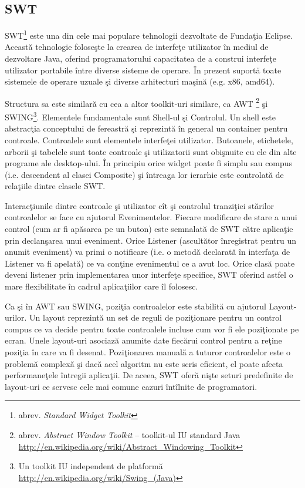 \subsection{SWT}
SWT\footnote{abrev. \textit{Standard Widget Toolkit}} este una din cele mai 
populare tehnologii dezvoltate de Fundaţia Eclipse. Această tehnologie 
foloseşte la crearea de interfeţe utilizator în mediul de dezvoltare Java, 
oferind programatorului capacitatea de a construi interfeţe utilizator 
portabile între diverse sisteme de operare. În prezent suportă toate sistemele 
de operare uzuale şi diverse arhitecturi maşină (e.g. x86, amd64).

Structura sa este similară cu cea a altor toolkit-uri similare, ca AWT 
\footnote{abrev. \textit{Abstract Window Toolkit} -- toolkit-ul IU standard 
Java \url{http://en.wikipedia.org/wiki/Abstract_Windowing_Toolkit}} şi 
SWING\footnote{Un toolkit IU independent de platformă 
\url{http://en.wikipedia.org/wiki/Swing_(Java)}}. Elementele fundamentale sunt 
Shell-ul şi Controlul. Un shell este abstracţia conceptului de fereastră şi 
reprezintă în general un container pentru controale. Controalele sunt 
elementele interfeţei utilizator. Butoanele, etichetele, arborii şi tabelele 
sunt toate controale şi utilizatorii sunt obişnuite cu ele din alte programe 
ale desktop-ului. \cite{swt} În principiu orice widget poate fi simplu sau 
compus (i.e. descendent al clasei Composite) şi întreaga lor ierarhie este 
controlată de relaţiile dintre clasele SWT.

Interacţiunile dintre controale şi utilizator cît şi controlul tranziţiei 
stărilor controalelor se face cu ajutorul Evenimentelor. Fiecare modificare de 
stare a unui control (cum ar fi apăsarea pe un buton) este semnalată de SWT 
către aplicaţie prin declanşarea unui eveniment. Orice Listener (ascultător 
înregistrat pentru un anumit eveniment) va primi o notificare (i.e. o metodă 
declarată în interfaţa de Listener va fi apelată) ce va conţine evenimentul ce 
a avut loc. Orice clasă poate deveni listener prin implementarea unor interfeţe 
specifice, SWT oferind astfel o mare flexibilitate în cadrul aplicaţiilor care 
îl folosesc.

Ca şi în AWT sau SWING, poziţia controalelor este stabilită cu ajutorul 
Layout-urilor. Un layout reprezintă un set de reguli de poziţionare pentru un 
control compus ce va decide pentru toate controalele incluse cum vor fi ele 
poziţionate pe ecran. Unele layout-uri asociază anumite date fiecărui control 
pentru a reţine poziţia în care va fi desenat. Poziţionarea manuală a tuturor 
controalelor este o problemă complexă şi dacă acel algoritm nu este scris 
eficient, el poate afecta performaneţele întregii aplicaţii. De aceea, SWT 
oferă nişte seturi predefinite de layout-uri ce servesc cele mai comune cazuri 
întîlnite de programatori.


